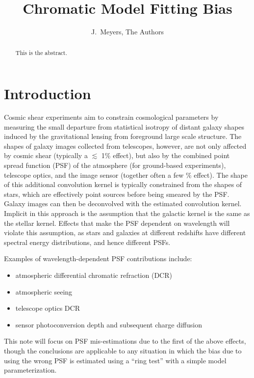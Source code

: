 \documentclass[apj]{emulateapj}
\begin{document}
\title{Chromatic Model Fitting Bias}

\author{
J.~Meyers,
The Authors}


\begin{abstract}
This is the abstract.
\end{abstract}

\section{Introduction}\label{sec:intro}
Cosmic shear experiments aim to constrain cosmological parameters by
measuring the small departure from statistical isotropy of distant
galaxy shapes induced by the gravitational lensing from foreground
large scale structure.  The shapes of galaxy images collected from
telescopes, however, are not only affected by cosmic shear (typically
a $\lesssim$ 1\% effect), but also by the combined point spread
function (PSF) of the atmosphere (for ground-based experiments),
telescope optics, and the image sensor (together often a few \%
effect).  The shape of this additional convolution kernel is typically
constrained from the shapes of stars, which are effectively point
sources before being smeared by the PSF.  Galaxy images can then be
deconvolved with the estimated convolution kernel.  Implicit in this
approach is the assumption that the galactic kernel is the same as the
stellar kernel.  Effects that make the PSF dependent on wavelength
will violate this assumption, as stars and galaxies at different
redshifts have different spectral energy distributions, and hence
different PSFs.

Examples of wavelength-dependent PSF contributions include:

\begin{itemize}
  \item atmospheric differential chromatic refraction (DCR)
  \item atmospheric seeing
  \item telescope optics DCR
  \item sensor photoconversion depth and subsequent charge diffusion
\end{itemize}

This note will focus on PSF mis-estimations due to the first of the
above effects, though the conclusions are applicable to any situation
in which the bias due to using the wrong PSF is estimated using a
``ring test'' with a simple model parameterization.
\end{document}
